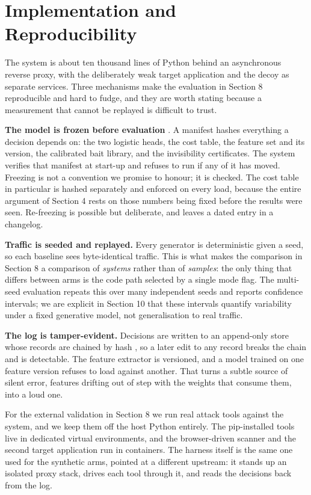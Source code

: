 
\section{Implementation and Reproducibility}

The system is about ten thousand lines of Python behind an asynchronous reverse
proxy, with the deliberately weak target application and the decoy as separate
services. Three mechanisms make the evaluation in Section 8 reproducible and hard
to fudge, and they are worth stating because a measurement that cannot be replayed
is difficult to trust.

\textbf{The model is frozen before evaluation} \cite{arp2022dos}. A manifest hashes
everything a decision depends on: the two logistic heads, the cost table, the
feature set and its version, the calibrated bait library, and the invisibility
certificates. The system verifies that manifest at start-up and refuses to run if
any of it has moved.
Freezing is not a convention we promise to honour; it is checked. The cost table in
particular is hashed separately and enforced on every load, because the entire
argument of Section 4 rests on those numbers being fixed before the results were
seen. Re-freezing is possible but deliberate, and leaves a dated entry in a
changelog.

\textbf{Traffic is seeded and replayed.} Every generator is deterministic given a seed,
so each baseline sees byte-identical traffic. This is what makes the comparison in
Section 8 a comparison of \emph{systems} rather than of \emph{samples}: the only thing that
differs between arms is the code path selected by a single mode flag. The
multi-seed evaluation repeats this over many independent seeds and reports
confidence intervals; we are explicit in Section 10 that these intervals quantify
variability under a fixed generative model, not generalisation to real traffic.

\textbf{The log is tamper-evident.} Decisions are written to an append-only store whose
records are chained by hash \cite{schneier1999secure}, so a later edit to any
record breaks the chain and is detectable. The feature extractor is versioned, and
a model trained on one feature version refuses to load against another. That turns
a subtle source of silent error, features drifting out of step with the weights
that consume them, into a loud one.

For the external validation in Section 8 we run real attack tools against the
system, and we keep them off the host Python entirely. The pip-installed tools live
in dedicated virtual environments, and the browser-driven scanner and the second
target application run in containers. The harness itself is the same one used for
the synthetic arms, pointed at a different upstream: it stands up an isolated proxy
stack, drives each tool through it, and reads the decisions back from the log.
